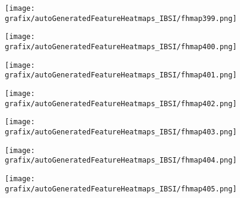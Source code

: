 \hspace{\hsp} 
\begin{subfigure}{\wid\textwidth} 
    \centering 
    \caption{\tiny \sffamily {}} 
    \vspace{\vsp} 
    \texttt{[image: grafix/autoGeneratedFeatureHeatmaps\_IBSI/fhmap399.png]} 
\end{subfigure} 
\hspace{\hsp} 
\begin{subfigure}{\wid\textwidth} 
    \centering 
    \caption{\tiny \sffamily {}} 
    \vspace{\vsp} 
    \texttt{[image: grafix/autoGeneratedFeatureHeatmaps\_IBSI/fhmap400.png]} 
\end{subfigure} 
\hspace{\hsp} 
\begin{subfigure}{\wid\textwidth} 
    \centering 
    \caption{\tiny \sffamily {}} 
    \vspace{\vsp} 
    \texttt{[image: grafix/autoGeneratedFeatureHeatmaps\_IBSI/fhmap401.png]} 
\end{subfigure} 
\hspace{\hsp} 
\begin{subfigure}{\wid\textwidth} 
    \centering 
    \caption{\tiny \sffamily {}} 
    \vspace{\vsp} 
    \texttt{[image: grafix/autoGeneratedFeatureHeatmaps\_IBSI/fhmap402.png]} 
\end{subfigure} 
\hspace{\hsp} 
\begin{subfigure}{\wid\textwidth} 
    \centering 
    \caption{\tiny \sffamily {}} 
    \vspace{\vsp} 
    \texttt{[image: grafix/autoGeneratedFeatureHeatmaps\_IBSI/fhmap403.png]} 
\end{subfigure} 
\hspace{\hsp} 
\begin{subfigure}{\wid\textwidth} 
    \centering 
    \caption{\tiny \sffamily {}} 
    \vspace{\vsp} 
    \texttt{[image: grafix/autoGeneratedFeatureHeatmaps\_IBSI/fhmap404.png]} 
\end{subfigure} 
\hspace{\hsp} 
\begin{subfigure}{\wid\textwidth} 
    \centering 
    \caption{\tiny \sffamily {}} 
    \vspace{\vsp} 
    \texttt{[image: grafix/autoGeneratedFeatureHeatmaps\_IBSI/fhmap405.png]} 
\end{subfigure} 
